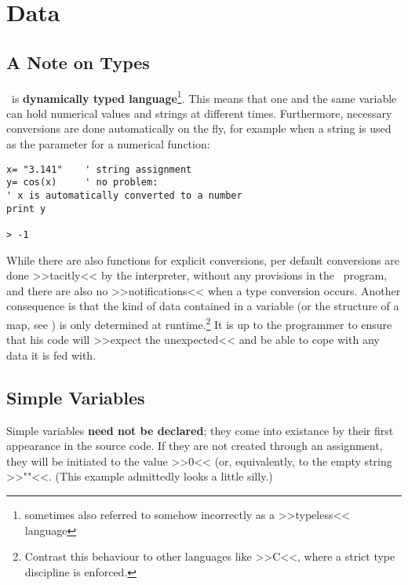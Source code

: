 \chapter{Data}


\section{A Note on Types \label{noteOnTypes}}

\SB\ is \textbf{dynamically typed language}\footnote{sometimes also
referred to somehow incorrectly as a >>typeless<< language}. This means
that one and the same variable can hold numerical values and strings at
different times.  Furthermore, necessary conversions
are done automatically on the fly, for example when a string is used as
the parameter for a numerical function:

\begin{lstlisting}
x= "3.141"    ' string assignment
y= cos(x)     ' no problem:
' x is automatically converted to a number
print y

> -1
\end{lstlisting}

While there are also functions for explicit conversions, per default
conversions are done >>tacitly<< by the interpreter, without any
provisions in the \SB\ program, and there are also no >>notifications<<
when a type conversion occurs. Another consequence is that the kind of
data contained in a variable (or the structure of a map, see )
is only determined at runtime.\footnote{Contrast this behaviour to other
languages like >>C<<, where a strict type discipline is enforced.} It is
up to the programmer to ensure that his code will >>expect the
unexpected<< and be able to cope with any data it is fed with.

\section{Simple Variables}

Simple variables \textbf{need not be declared}; they come into existance by their
first appearance in the source code. If they are not created through an
assignment, they will be initiated to the value >>$0$<< (or,
equivalently, to the empty string >>""<<. (This example admittedly looks a
little silly.) 

